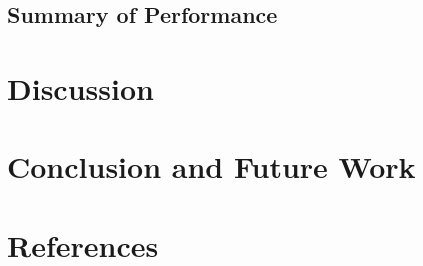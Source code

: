 \documentclass[letterpaper,twocolumn,11pt]{article}
\begin{document}
\subsection{Summary of Performance}

\section{Discussion}

\section{Conclusion and Future Work}

\section{References}
\end{document}
